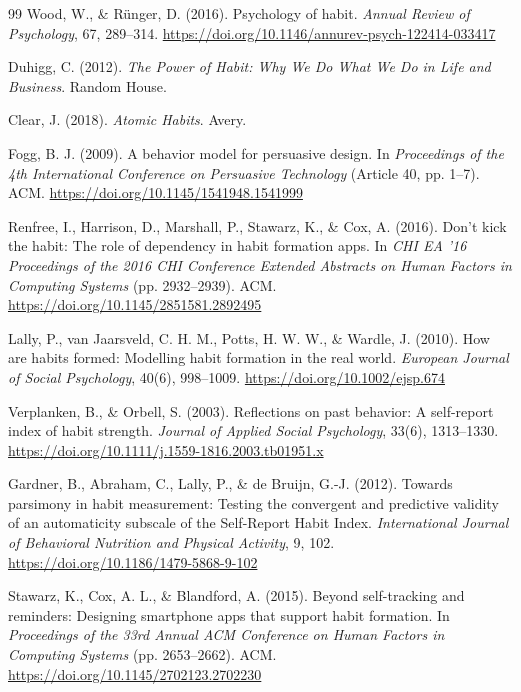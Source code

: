 \singlespace
{}
\begin{thebibliography}{99}
    Wood, W., \& R\"unger, D. (2016). Psychology of habit. \textit{Annual Review of Psychology}, 67, 289--314. \url{https://doi.org/10.1146/annurev-psych-122414-033417}

    Duhigg, C. (2012). \textit{The Power of Habit: Why We Do What We Do in Life and Business}. Random House.

    Clear, J. (2018). \textit{Atomic Habits}. Avery.

    Fogg, B. J. (2009). A behavior model for persuasive design. In \textit{Proceedings of the 4th International Conference on Persuasive Technology} (Article 40, pp. 1--7). ACM. \url{https://doi.org/10.1145/1541948.1541999}

    Renfree, I., Harrison, D., Marshall, P., Stawarz, K., \& Cox, A. (2016). Don't kick the habit: The role of dependency in habit formation apps. In \textit{CHI EA '16 Proceedings of the 2016 CHI Conference Extended Abstracts on Human Factors in Computing Systems} (pp. 2932--2939). ACM. \url{https://doi.org/10.1145/2851581.2892495}

    Lally, P., van Jaarsveld, C. H. M., Potts, H. W. W., \& Wardle, J. (2010). How are habits formed: Modelling habit formation in the real world. \textit{European Journal of Social Psychology}, 40(6), 998--1009. \url{https://doi.org/10.1002/ejsp.674}

    Verplanken, B., \& Orbell, S. (2003). Reflections on past behavior: A self-report index of habit strength. \textit{Journal of Applied Social Psychology}, 33(6), 1313--1330. \url{https://doi.org/10.1111/j.1559-1816.2003.tb01951.x}

    Gardner, B., Abraham, C., Lally, P., \& de Bruijn, G.-J. (2012). Towards parsimony in habit measurement: Testing the convergent and predictive validity of an automaticity subscale of the Self-Report Habit Index. \textit{International Journal of Behavioral Nutrition and Physical Activity}, 9, 102. \url{https://doi.org/10.1186/1479-5868-9-102}

    Stawarz, K., Cox, A. L., \& Blandford, A. (2015). Beyond self-tracking and reminders: Designing smartphone apps that support habit formation. In \textit{Proceedings of the 33rd Annual ACM Conference on Human Factors in Computing Systems} (pp. 2653--2662). ACM. \url{https://doi.org/10.1145/2702123.2702230}


\end{thebibliography}
